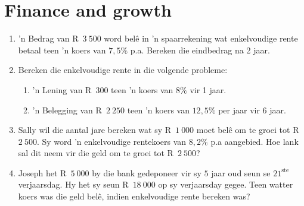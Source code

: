 \chapter{Finance and growth}
\begin{exercises}{}{
    \begin{enumerate}[itemsep=6pt, label=\textbf{\arabic*}.]
	\item ’n Bedrag van R~$3~500$ word belê in ’n spaarrekening wat enkelvoudige rente betaal teen ’n koers van $7,5\%$ p.a. Bereken die eindbedrag na 2 jaar.

	\item Bereken die enkelvoudige rente in die volgende probleme:
	\begin{enumerate}
	    \item ’n Lening van R~$300$  teen ’n koers van $8\%$ vir 1 jaar.

	    \item ’n Belegging van R~$2~250$ teen ’n koers van $12,5\%$ per jaar vir 6 jaar.
	\end{enumerate}

	\item Sally wil die aantal jare bereken wat sy R~$1~000$ moet bel\^e om te groei tot R~$2~500$. Sy word 'n enkelvoudige rentekoers van $8,2\%$ p.a aangebied. Hoe lank sal dit neem vir die geld om te groei tot R~$2~500$?

	\item Joseph het R~$5~000$ by die bank gedeponeer vir sy $5$ jaar oud seun se $21^{\mathrm{ste}}$ verjaarsdag. Hy het sy seun R~$18~000$ op sy verjaarsday gegee. Teen watter koers was die geld belê, indien enkelvoudige rente bereken was?
    \end{enumerate}
}
\end{exercises}


